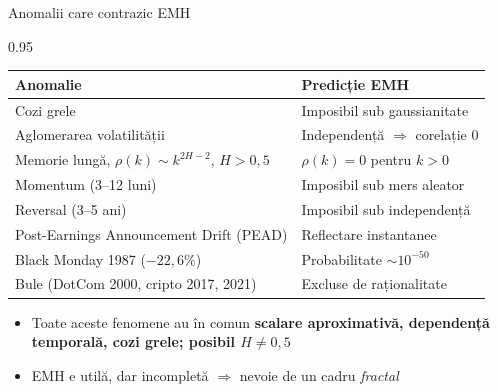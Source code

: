 \documentclass[9pt, aspectratio=169, t]{beamer}
\begin{document}
\begin{frame}[shrink=15]{Anomalii care contrazic EMH}
\begin{cminipage}{0.95\textwidth}
\renewcommand{\arraystretch}{1.2}
\begin{center}
\small
\begin{tabular}{ll}
\toprule
\textbf{Anomalie} & \textbf{Predicție EMH} \\
\midrule
Cozi grele & Imposibil sub gaussianitate \\
Aglomerarea volatilității & Independență $\Rightarrow$ corelație 0 \\
Memorie lungă, $\rho(k)\sim k^{2H-2}$, $H>0{,}5$ & $\rho(k)=0$ pentru $k>0$ \\
Momentum (3--12 luni) & Imposibil sub mers aleator \\
Reversal (3--5 ani) & Imposibil sub independență \\
Post-Earnings Announcement Drift (PEAD) & Reflectare instantanee \\
Black Monday 1987 ($-22{,}6\%$) & Probabilitate $\sim 10^{-50}$ \\
Bule (DotCom 2000, cripto 2017, 2021) & Excluse de raționalitate \\
\bottomrule
\end{tabular}
\end{center}
\vspace{0.15cm}
\begin{itemize}\setlength{\itemsep}{0pt}
    \item Toate aceste fenomene au în comun \textbf{scalare aproximativă, dependență temporală, cozi grele; posibil $H\neq 0{,}5$}
    \item EMH e utilă, dar incompletă $\Rightarrow$ nevoie de un cadru \textit{fractal}
\end{itemize}
\end{cminipage}
\end{frame}
\end{document}

